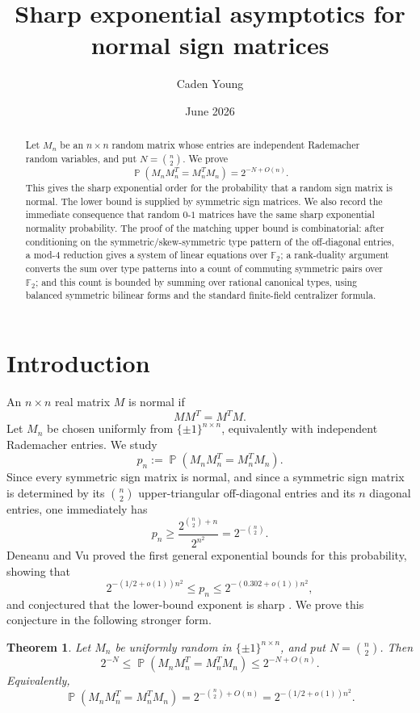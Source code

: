 \documentclass[11pt]{amsart}
\title[Normal sign matrices]{Sharp exponential asymptotics for normal sign matrices}
\author{Caden Young}
\date{June 2026}
\newtheorem{theorem}{Theorem}[section]
\theoremstyle{remark}
\numberwithin{equation}{section}
\newcommand{\F}{\mathbb F}
\DeclareMathOperator{\probb}{\mathbb P}
\begin{document}
\begin{abstract}
Let $M_n$ be an $n\times n$ random matrix whose entries are independent Rademacher random variables, and put $N=\binom n2$.  We prove
\[
        \probb(M_nM_n^T=M_n^TM_n)=2^{-N+O(n)}.
\]
This gives the sharp exponential order for the probability that a random sign matrix is normal.  The lower bound is supplied by symmetric sign matrices.  We also record the immediate consequence that random $0$-$1$ matrices have the same sharp exponential normality probability.  The proof of the matching upper bound is combinatorial: after conditioning on the symmetric/skew-symmetric type pattern of the off-diagonal entries, a mod-$4$ reduction gives a system of linear equations over $\F_2$; a rank-duality argument converts the sum over type patterns into a count of commuting symmetric pairs over $\F_2$; and this count is bounded by summing over rational canonical types, using balanced symmetric bilinear forms and the standard finite-field centralizer formula.
\end{abstract}
\maketitle

\section{Introduction}

An $n\times n$ real matrix $M$ is normal if
\[
        MM^T=M^TM.
\]
Let $M_n$ be chosen uniformly from $\{\pm1\}^{n\times n}$, equivalently with independent Rademacher entries.  We study
\[
        p_n:=\probb(M_nM_n^T=M_n^TM_n).
\]
Since every symmetric sign matrix is normal, and since a symmetric sign matrix is determined by its $\binom n2$ upper-triangular off-diagonal entries and its $n$ diagonal entries, one immediately has
\[
        p_n\geq \frac{2^{\binom n2+n}}{2^{n^2}}=2^{-\binom n2}.
\]
Deneanu and Vu proved the first general exponential bounds for this probability, showing that
\[
        2^{-(1/2+o(1))n^2}\leq p_n\leq 2^{-(0.302+o(1))n^2},
\]
and conjectured that the lower-bound exponent is sharp \cite{DeneanuVu2019}.  We prove this conjecture in the following stronger form.

\begin{theorem}\label{thm:main}
Let $M_n$ be uniformly random in $\{\pm1\}^{n\times n}$, and put $N=\binom n2$.  Then
\[
        2^{-N}\leq \probb(M_nM_n^T=M_n^TM_n)\leq 2^{-N+O(n)}.
\]
Equivalently,
\[
        \probb(M_nM_n^T=M_n^TM_n)=2^{-\binom n2+O(n)}=2^{-(1/2+o(1))n^2}.
\]
\end{theorem}
\end{document}

